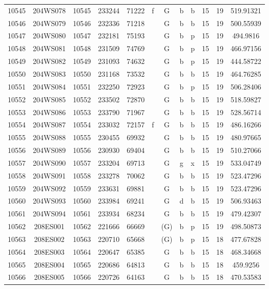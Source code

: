 \begin{tabular}{|*{12}{c|}}
10545 & 204WS078 & 10545 & 233244 & 71222 & f & G & b & b & 15 & 19 & 519.91321 \\ 
10546 & 204WS079 & 10546 & 232336 & 71218 &  & G & b & b & 15 & 19 & 500.55939 \\ 
10547 & 204WS080 & 10547 & 232181 & 75193 &  & G & b & p & 15 & 19 & 494.9816 \\ 
10548 & 204WS081 & 10548 & 231509 & 74769 &  & G & b & p & 15 & 19 & 466.97156 \\ 
10549 & 204WS082 & 10549 & 231093 & 74632 &  & G & b & p & 15 & 19 & 444.58722 \\ 
10550 & 204WS083 & 10550 & 231168 & 73532 &  & G & b & b & 15 & 19 & 464.76285 \\ 
10551 & 204WS084 & 10551 & 232250 & 72923 &  & G & b & p & 15 & 19 & 506.28406 \\ 
10552 & 204WS085 & 10552 & 233502 & 72870 &  & G & b & b & 15 & 19 & 518.59827 \\ 
10553 & 204WS086 & 10553 & 233790 & 71967 &  & G & b & b & 15 & 19 & 528.56714 \\ 
10554 & 204WS087 & 10554 & 233032 & 72157 & f & G & b & b & 15 & 19 & 486.16266 \\ 
10555 & 204WS088 & 10555 & 230455 & 69932 &  & G & b & b & 15 & 19 & 480.97665 \\ 
10556 & 204WS089 & 10556 & 230930 & 69404 &  & G & b & b & 15 & 19 & 510.27066 \\ 
10557 & 204WS090 & 10557 & 233204 & 69713 &  & G & g & x & 15 & 19 & 533.04749 \\ 
10558 & 204WS091 & 10558 & 233278 & 70062 &  & G & b & b & 15 & 19 & 523.47296 \\ 
10559 & 204WS092 & 10559 & 233631 & 69881 &  & G & b & b & 15 & 19 & 523.47296 \\ 
10560 & 204WS093 & 10560 & 233984 & 69241 &  & G & d & b & 15 & 19 & 506.93463 \\ 
10561 & 204WS094 & 10561 & 233934 & 68234 &  & G & b & b & 15 & 19 & 479.42307 \\ 
10562 & 208ES001 & 10562 & 221666 & 66669 &  & (G) & b & p & 15 & 19 & 498.50873 \\ 
10563 & 208ES002 & 10563 & 220710 & 65668 &  & (G) & b & p & 15 & 18 & 477.67828 \\ 
10564 & 208ES003 & 10564 & 220647 & 65385 &  & G & b & b & 15 & 18 & 468.34668 \\ 
10565 & 208ES004 & 10565 & 220686 & 64813 &  & G & b & b & 15 & 18 & 459.9256 \\ 
10566 & 208ES005 & 10566 & 220726 & 64163 &  & G & b & b & 15 & 18 & 470.53583 \\ 

\end{tabular}
